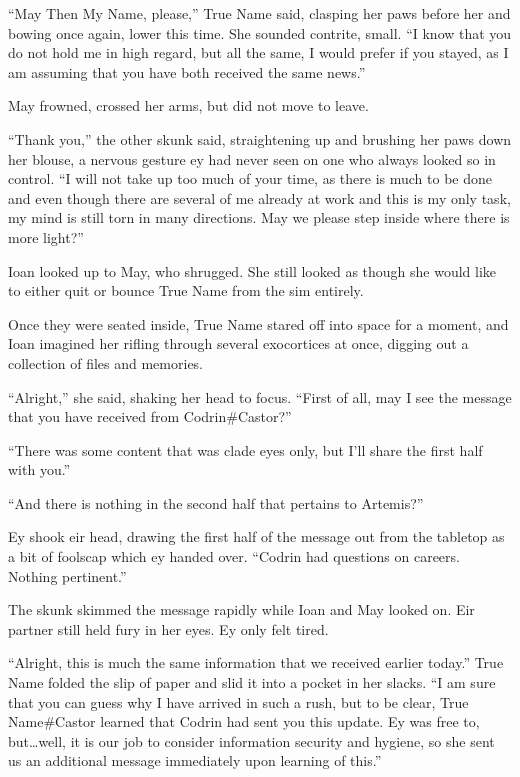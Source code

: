 ``May Then My Name, please,'' True Name said, clasping her paws before her and bowing once again, lower this time. She sounded contrite, small. ``I know that you do not hold me in high regard, but all the same, I would prefer if you stayed, as I am assuming that you have both received the same news.''

May frowned, crossed her arms, but did not move to leave.

``Thank you,'' the other skunk said, straightening up and brushing her paws down her blouse, a nervous gesture ey had never seen on one who always looked so in control. ``I will not take up too much of your time, as there is much to be done and even though there are several of me already at work and this is my only task, my mind is still torn in many directions. May we please step inside where there is more light?''

Ioan looked up to May, who shrugged. She still looked as though she would like to either quit or bounce True Name from the sim entirely.

Once they were seated inside, True Name stared off into space for a moment, and Ioan imagined her rifling through several exocortices at once, digging out a collection of files and memories.

``Alright,'' she said, shaking her head to focus. ``First of all, may I see the message that you have received from Codrin\#Castor?''

``There was some content that was clade eyes only, but I'll share the first half with you.''

``And there is nothing in the second half that pertains to Artemis?''

Ey shook eir head, drawing the first half of the message out from the tabletop as a bit of foolscap which ey handed over. ``Codrin had questions on careers. Nothing pertinent.''

The skunk skimmed the message rapidly while Ioan and May looked on. Eir partner still held fury in her eyes. Ey only felt tired.

``Alright, this is much the same information that we received earlier today.'' True Name folded the slip of paper and slid it into a pocket in her slacks. ``I am sure that you can guess why I have arrived in such a rush, but to be clear, True Name\#Castor learned that Codrin had sent you this update. Ey was free to, but\ldots well, it is our job to consider information security and hygiene, so she sent us an additional message immediately upon learning of this.''

